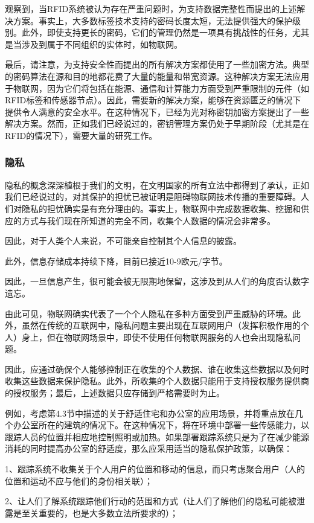 \documentclass[12pt,a4paper]{article}%
\begin{document}
观察到，当RFID系统被认为存在严重问题时，为支持数据完整性而提出的上述解决方案。事实上，大多数标签技术支持的密码长度太短，无法提供强大的保护级别。此外，即使支持更长的密码，它们的管理仍然是一项具有挑战性的任务，尤其是当涉及到属于不同组织的实体时，如物联网。

最后，请注意，为支持安全性而提出的所有解决方案都使用了一些加密方法。典型的密码算法在源和目的地都花费了大量的能量和带宽资源。这种解决方案无法应用于物联网，因为它们将包括在能源、通信和计算能力方面受到严重限制的元件（如RFID标签和传感器节点）。因此，需要新的解决方案，能够在资源匮乏的情况下提供令人满意的安全水平。在这种情况下，已经为光对称密钥加密方案提出了一些解决方案。然而，正如我们已经说过的，密钥管理方案仍处于早期阶段（尤其是在RFID的情况下），需要大量的研究工作。
\subsubsection{隐私}
隐私的概念深深植根于我们的文明，在文明国家的所有立法中都得到了承认，正如我们已经说过的，对其保护的担忧已被证明是阻碍物联网技术传播的重要障碍。人们对隐私的担忧确实是有充分理由的。事实上，物联网中完成数据收集、挖掘和供应的方式与我们现在所知道的完全不同，收集个人数据的情况会非常多。

因此，对于人类个人来说，不可能亲自控制其个人信息的披露。

此外，信息存储成本持续下降，目前已接近10-9欧元/字节。

因此，一旦信息产生，很可能会被无限期地保留，这涉及到从人们的角度否认数字遗忘。

由此可见，物联网确实代表了一个个人隐私在多种方面受到严重威胁的环境。此外，虽然在传统的互联网中，隐私问题主要出现在互联网用户（发挥积极作用的个人）身上，但在物联网场景中，即使不使用任何物联网服务的人也会出现隐私问题。

因此，应通过确保个人能够控制正在收集的个人数据、谁在收集这些数据以及何时收集这些数据来保护隐私。此外，所收集的个人数据只能用于支持授权服务提供商的授权服务；最后，上述数据只应存储到严格需要时为止。

例如，考虑第4.3节中描述的关于舒适住宅和办公室的应用场景，并将重点放在几个办公室所在的建筑的情况下。在这种情况下，将在环境中部署一些传感能力，以跟踪人员的位置并相应地控制照明或加热。如果部署跟踪系统只是为了在减少能源消耗的同时提高办公室的舒适度，那么应采用适当的隐私保护政策，以确保：

1、跟踪系统不收集关于个人用户的位置和移动的信息，而只考虑聚合用户（人的位置和运动不应与他们的身份相关联）；

2、让人们了解系统跟踪他们行动的范围和方式（让人们了解他们的隐私可能被泄露是至关重要的，也是大多数立法所要求的）；
\end{document}
